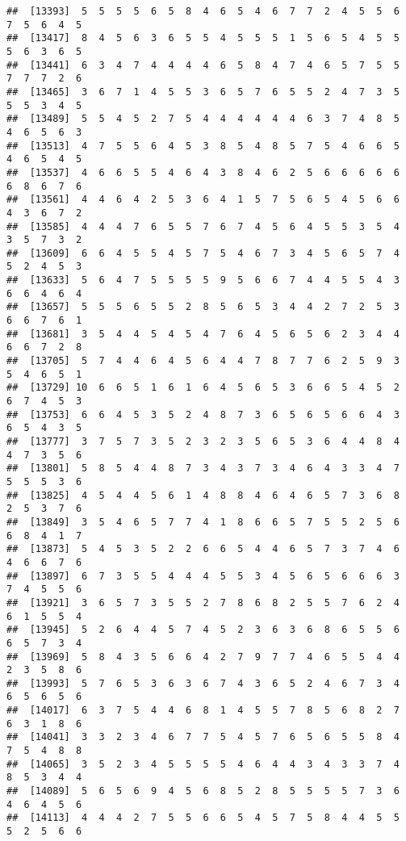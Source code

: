 \documentclass[
]{book}
\begin{document}
\begin{verbatim}
##  [13393]  5  5  5  5  6  5  8  4  6  5  4  6  7  7  2  4  5  5  6  7  5  6  4  5
##  [13417]  8  4  5  6  3  6  5  5  4  5  5  5  1  5  6  5  4  5  5  5  6  3  6  5
##  [13441]  6  3  4  7  4  4  4  4  6  5  8  4  7  4  6  5  7  5  5  7  7  7  2  6
##  [13465]  3  6  7  1  4  5  5  3  6  5  7  6  5  5  2  4  7  3  5  5  5  3  4  5
##  [13489]  5  5  4  5  2  7  5  4  4  4  4  4  4  6  3  7  4  8  5  4  6  5  6  3
##  [13513]  4  7  5  5  6  4  5  3  8  5  4  8  5  7  5  4  6  6  5  4  6  5  4  5
##  [13537]  4  6  6  5  5  4  6  4  3  8  4  6  2  5  6  6  6  6  6  6  8  6  7  6
##  [13561]  4  4  6  4  2  5  3  6  4  1  5  7  5  6  5  4  5  6  6  4  3  6  7  2
##  [13585]  4  4  4  7  6  5  5  7  6  7  4  5  6  4  5  5  3  5  4  3  5  7  3  2
##  [13609]  6  6  4  5  5  4  5  7  5  4  6  7  3  4  5  6  5  7  4  5  2  4  5  3
##  [13633]  5  6  4  7  5  5  5  5  9  5  6  6  7  4  4  5  5  4  3  6  6  4  6  4
##  [13657]  5  5  5  6  5  5  2  8  5  6  5  3  4  4  2  7  2  5  3  6  6  7  6  1
##  [13681]  3  5  4  4  5  4  5  4  7  6  4  5  6  5  6  2  3  4  4  6  6  7  2  8
##  [13705]  5  7  4  4  6  4  5  6  4  4  7  8  7  7  6  2  5  9  3  5  4  6  5  1
##  [13729] 10  6  6  5  1  6  1  6  4  5  6  5  3  6  6  5  4  5  2  6  7  4  5  3
##  [13753]  6  6  4  5  3  5  2  4  8  7  3  6  5  6  5  6  6  4  3  6  5  4  3  5
##  [13777]  3  7  5  7  3  5  2  3  2  3  5  6  5  3  6  4  4  8  4  4  7  3  5  6
##  [13801]  5  8  5  4  4  8  7  3  4  3  7  3  4  6  4  3  3  4  7  5  5  5  3  6
##  [13825]  4  5  4  4  5  6  1  4  8  8  4  6  4  6  5  7  3  6  8  2  5  3  7  6
##  [13849]  3  5  4  6  5  7  7  4  1  8  6  6  5  7  5  5  2  5  6  6  8  4  1  7
##  [13873]  5  4  5  3  5  2  2  6  6  5  4  4  6  5  7  3  7  4  6  4  6  6  7  6
##  [13897]  6  7  3  5  5  4  4  4  5  5  3  4  5  6  5  6  6  6  3  7  4  5  5  6
##  [13921]  3  6  5  7  3  5  5  2  7  8  6  8  2  5  5  7  6  2  4  6  1  5  5  4
##  [13945]  5  2  6  4  4  5  7  4  5  2  3  6  3  6  8  6  5  5  6  6  5  7  3  4
##  [13969]  5  8  4  3  5  6  6  4  2  7  9  7  7  4  6  5  5  4  4  2  3  5  8  6
##  [13993]  5  7  6  5  3  6  3  6  7  4  3  6  5  2  4  6  7  3  4  6  5  6  5  6
##  [14017]  6  3  7  5  4  4  6  8  1  4  5  5  7  8  5  6  8  2  7  6  3  1  8  6
##  [14041]  3  3  2  3  4  6  7  7  5  4  5  7  6  5  6  5  5  8  4  7  5  4  8  8
##  [14065]  3  5  2  3  4  5  5  5  5  4  6  4  4  3  4  3  3  7  4  8  5  3  4  4
##  [14089]  5  6  5  6  9  4  5  6  8  5  2  8  5  5  5  5  7  3  6  4  6  4  5  6
##  [14113]  4  4  4  2  7  5  5  6  6  5  4  5  7  5  8  4  4  5  5  5  2  5  6  6

\end{verbatim}
\end{document}

